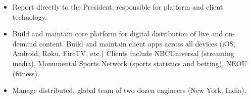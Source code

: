 \documentclass[a4paper,10pt]{memoir} %
\begin{document}
\Sep %


\begin{itemize}
	\item Report directly to the President, responsible for platform and 
	client technology.

	\item Build and maintain core platform for digital distribution of live 
	and on-demand content. Build and maintain client apps  
	across all devices (iOS, Android, Roku, FireTV, etc.) Clients include 
	NBCUniversal (streaming media), Monumental Sports Network (sports 
	statistics and betting), NEOU (fitness).
	
	\item Manage distributed, global team of two dozen engineers (New York, 
	India).
\end{itemize}

\Sep %

\end{document}
